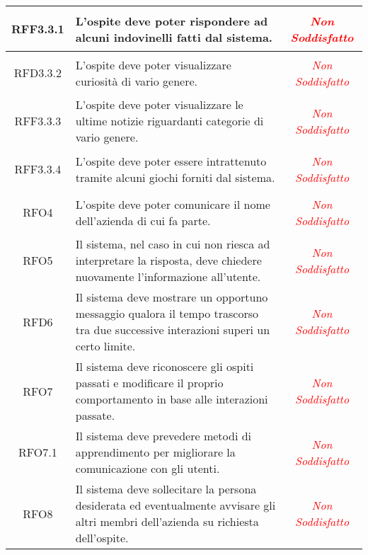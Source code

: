 \begin{longtable}{|c|>{\centering}m{7cm}|c|}
\hypertarget{RFF3.3.1}{RFF3.3.1} & L'ospite deve poter rispondere ad alcuni indovinelli fatti dal sistema. & \textcolor{red}{\textit{Non Soddisfatto}}\\ \hline

\hypertarget{RFD3.3.2}{RFD3.3.2} & L'ospite deve poter visualizzare curiosità  di vario genere. & \textcolor{red}{\textit{Non Soddisfatto}}\\ \hline

\hypertarget{RFF3.3.3}{RFF3.3.3} & L'ospite deve poter visualizzare le ultime notizie riguardanti categorie di vario genere. & \textcolor{red}{\textit{Non Soddisfatto}}\\ \hline

\hypertarget{RFF3.3.4}{RFF3.3.4} & L'ospite deve poter essere intrattenuto tramite alcuni giochi forniti dal sistema. & \textcolor{red}{\textit{Non Soddisfatto}}\\ \hline

\hypertarget{RFO4}{RFO4} & L'ospite deve poter comunicare il nome dell'azienda di cui fa parte. & \textcolor{red}{\textit{Non Soddisfatto}}\\ \hline

\hypertarget{RFO5}{RFO5} & Il sistema, nel caso in cui non riesca ad interpretare la risposta, deve chiedere nuovamente l'informazione all'utente. & \textcolor{red}{\textit{Non Soddisfatto}}\\ \hline

\hypertarget{RFD6}{RFD6} & Il sistema deve mostrare un opportuno messaggio qualora il tempo trascorso tra due successive interazioni superi un certo limite. & \textcolor{red}{\textit{Non Soddisfatto}}\\ \hline

\hypertarget{RFO7}{RFO7} & Il sistema deve riconoscere gli ospiti passati e modificare il proprio comportamento in base alle interazioni passate. & \textcolor{red}{\textit{Non Soddisfatto}}\\ \hline

\hypertarget{RFO7.1}{RFO7.1} & Il sistema deve prevedere metodi di apprendimento per migliorare la comunicazione con gli utenti. & \textcolor{red}{\textit{Non Soddisfatto}}\\ \hline

\hypertarget{RFO8}{RFO8} & Il sistema deve sollecitare la persona desiderata ed eventualmente avvisare gli altri membri dell'azienda su richiesta dell'ospite. & \textcolor{red}{\textit{Non Soddisfatto}}\\ \hline


\end{longtable}
